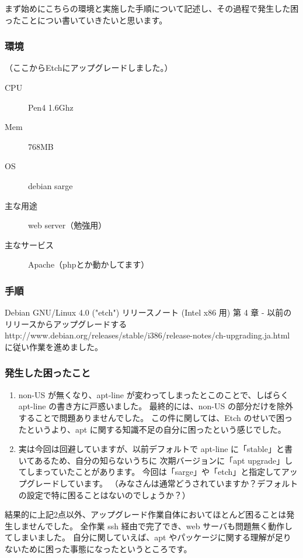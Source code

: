 \documentclass[mingoth,a4paper]{jsarticle}
\begin{document}
まず始めにこちらの環境と実施した手順について記述し、その過程で発生した困ったことについ書いていきたいと思います。

\subsubsection{環境}

（ここからEtchにアップグレードしました。）
\begin{description}
 \item 	 [CPU]Pen4 1.6Ghz
 \item	 [Mem]768MB
 \item	 [OS]debian sarge
 \item	 [主な用途]web server（勉強用）
 \item	 [主なサービス]Apache（phpとか動かしてます）
\end{description}

\subsubsection{手順}
	Debian GNU/Linux 4.0 ("etch") リリースノート (Intel x86 用)
	第 4 章 - 以前のリリースからアップグレードする
	http://www.debian.org/releases/stable/i386/release-notes/ch-upgrading.ja.html
	に従い作業を進めました。

\subsubsection{発生した困ったこと}

\begin{enumerate}
 \item	 non-US が無くなり、apt-line が変わってしまったとこのことで、しばらく apt-line の書き方に戸惑いました。
	最終的には、non-US の部分だけを除外することで問題ありませんでした。
	この件に関しては、Etch のせいで困ったというより、apt に関する知識不足の自分に困ったという感じでした。
 \item	 実は今回は回避していますが、以前デフォルトで apt-line に「stable」と書いてあるため、自分の知らないうちに
	次期バージョンに「apt upgrade」してしまっていたことがあります。
	今回は「sarge」や「etch」と指定してアップグレードしています。
	（みなさんは通常どうされていますか？デフォルトの設定で特に困ることはないのでしょうか？）
\end{enumerate}

結果的に上記2点以外、アップグレード作業自体においてほとんど困ることは発生しませんでした。
全作業 ssh 経由で完了でき、web サーバも問題無く動作してしまいました。
自分に関していえば、apt やパッケージに関する理解が足りないために困った事態になったというところです。
\end{document}
